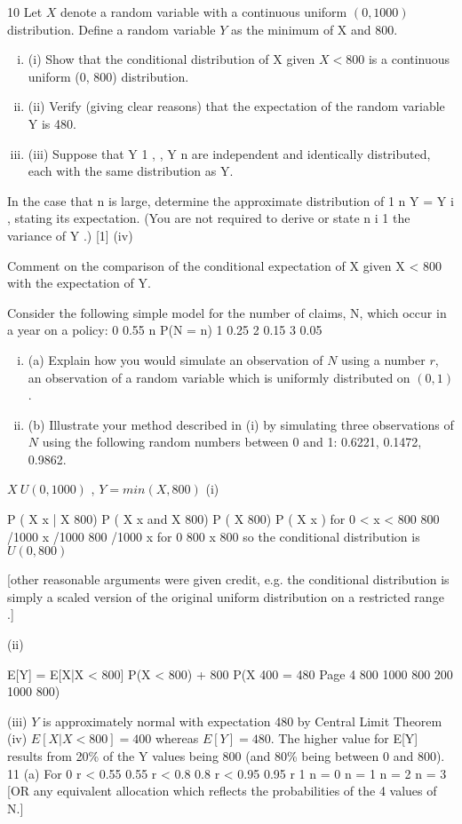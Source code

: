 \documentclass[a4paper,12pt]{article}
\begin{document}
10
Let $X$ denote a random variable with a continuous uniform $(0, 1000)$ distribution. Define a random variable $Y$ as the minimum of X and 800.

\begin{enumerate}[(i)]
\item (i) Show that the conditional distribution of X given $X < 800$ is a continuous uniform (0, 800) distribution.
\item (ii) Verify (giving clear reasons) that the expectation of the random variable Y is 480.
\item (iii) Suppose that Y 1 , , Y n are independent and identically distributed, each with the same distribution as Y.
\end{enumerate}
In the case that n is large, determine the approximate distribution of
1 n
Y =
Y i , stating its expectation. (You are not required to derive or state
n i 1
the variance of Y .)
[1]
(iv)

Comment on the comparison of the conditional expectation of X given X < 800 with the expectation of Y.

Consider the following simple model for the number of claims, N, which occur in a  year on a policy:
0
0.55
n
P(N = n)
1
0.25
2
0.15
3
0.05
\begin{enumerate}[(i)]
\item (a) Explain how you would simulate an observation of $N$ using a number $r$, an observation of a random variable which is uniformly distributed on $(0, 1)$.
\item (b) Illustrate your method described in (i) by simulating three observations of $N$ using the following random numbers between 0 and 1: 0.6221, 0.1472, 0.9862.
\end{enumerate}

$X ~ U(0,1000)$ , $Y = min(X,800)$
(i)

P ( X
x | X
800)
P ( X
x and X 800)
P ( X 800)
P ( X x )
for 0 < x < 800
800 /1000
x /1000
800 /1000
x
for 0
800
x 800
so the conditional distribution is $U(0,800)$

[other reasonable arguments were given credit, e.g. the conditional distribution is simply a scaled version of the original uniform distribution on a restricted range .]


(ii)

E[Y] = E[X|X < 800] P(X < 800) + 800 P(X
400
= 480
Page 4
800
1000
800
200
1000
800)

(iii) $Y$ is approximately normal with expectation 480 by Central Limit Theorem
(iv) $E[X | X < 800] = 400$ whereas $E[Y] = 480$.
The higher value for E[Y] results from 20\% of the Y values being 800 (and 80\% being between 0 and 800).
11
(a)
For 0 r < 0.55
0.55 r < 0.8
0.8 r < 0.95
0.95 r 1
n = 0
n = 1
n = 2
n = 3
[OR any equivalent allocation which reflects the probabilities of the 4 values
of N.]
\end{document}

